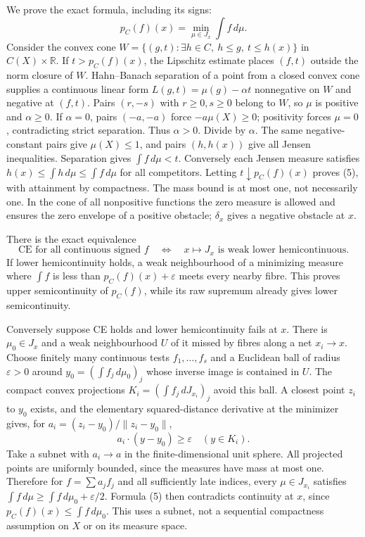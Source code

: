 \documentclass[11pt]{article}
\begin{document}
We prove the exact formula, including its signs:
\[
 p_C(f)(x)=\min_{\mu\in J_x}\int f\,d\mu. \tag{5}
\]
Consider the convex cone $W=\{(g,t):\exists h\in C,\ h\le g,\ t\le h(x)\}$ in $C(X)\times\mathbb R$. If $t>p_C(f)(x)$, the Lipschitz estimate places $(f,t)$ outside the norm closure of $W$. Hahn--Banach separation of a point from a closed convex cone supplies a continuous linear form $L(g,t)=\mu(g)-\alpha t$ nonnegative on $W$ and negative at $(f,t)$. Pairs $(r,-s)$ with $r\ge0,s\ge0$ belong to $W$, so $\mu$ is positive and $\alpha\ge0$. If $\alpha=0$, pairs $(-a,-a)$ force $-a\mu(X)\ge0$; positivity forces $\mu=0$, contradicting strict separation. Thus $\alpha>0$. Divide by $\alpha$. The same negative-constant pairs give $\mu(X)\le1$, and pairs $(h,h(x))$ give all Jensen inequalities. Separation gives $\int f\,d\mu<t$. Conversely each Jensen measure satisfies $h(x)\le\int h\,d\mu\le\int f\,d\mu$ for all competitors. Letting $t\downarrow p_C(f)(x)$ proves (5), with attainment by compactness. The mass bound is at most one, not necessarily one. In the cone of all nonpositive functions the zero measure is allowed and ensures the zero envelope of a positive obstacle; $\delta_x$ gives a negative obstacle at $x$.

There is the exact equivalence
\[
 \text{CE for all continuous signed }f
 \quad\Longleftrightarrow\quad x\mapsto J_x\text{ is weak lower hemicontinuous}. \tag{6}
\]
If lower hemicontinuity holds, a weak neighbourhood of a minimizing measure where $\int f$ is less than $p_C(f)(x)+\varepsilon$ meets every nearby fibre. This proves upper semicontinuity of $p_C(f)$, while its raw supremum already gives lower semicontinuity.

Conversely suppose CE holds and lower hemicontinuity fails at $x$. There is $\mu_0\in J_x$ and a weak neighbourhood $U$ of it missed by fibres along a net $x_i\to x$. Choose finitely many continuous tests $f_1,\ldots,f_s$ and a Euclidean ball of radius $\varepsilon>0$ around $y_0=(\int f_j\,d\mu_0)_j$ whose inverse image is contained in $U$. The compact convex projections $K_i=(\int f_j\,dJ_{x_i})_j$ avoid this ball. A closest point $z_i$ to $y_0$ exists, and the elementary squared-distance derivative at the minimizer gives, for $a_i=(z_i-y_0)/\|z_i-y_0\|$,
\[
 a_i\cdot(y-y_0)\ge\varepsilon\quad(y\in K_i).
\]
Take a subnet with $a_i\to a$ in the finite-dimensional unit sphere. All projected points are uniformly bounded, since the measures have mass at most one. Therefore for $f=\sum a_j f_j$ and all sufficiently late indices, every $\mu\in J_{x_i}$ satisfies $\int f\,d\mu\ge\int f\,d\mu_0+\varepsilon/2$. Formula (5) then contradicts continuity at $x$, since $p_C(f)(x)\le\int f\,d\mu_0$. This uses a subnet, not a sequential compactness assumption on $X$ or on its measure space.
\end{document}
